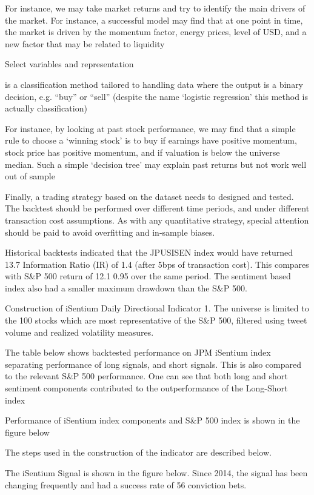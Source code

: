 \documentclass[a4paper]{article}
\begin{document}
For instance, we may take market returns and try to
identify the main drivers of the market. For instance, a successful model may find that at one point in time, the market is
driven by the momentum factor, energy prices, level of USD, and a new factor that may be related to liquidity

Select variables and representation

is a classification method tailored to handling data where the output is a
binary decision, e.g. “buy” or “sell” (despite the name ‘logistic regression’ this method is actually classification)

 For
instance, by looking at past stock performance, we may find that a simple rule to choose a ‘winning stock’ is to buy if
earnings have positive momentum, stock price has positive momentum, and if valuation is below the universe median. Such
a simple ‘decision tree’ may explain past returns but not work well out of sample

Finally, a trading strategy based on the dataset needs to designed and
tested. The backtest should be performed over different time periods, and under different transaction cost assumptions. As
with any quantitative strategy, special attention should be paid to avoid overfitting and in-sample biases. 

Historical backtests indicated that the JPUSISEN index would have returned 13.7%
Information Ratio (IR) of 1.4 (after 5bps of transaction cost). This compares with S\&P 500 return of 12.1%
0.95 over the same period. The sentiment based index also had a smaller maximum drawdown than the S\&P 500.

Construction of iSentium Daily Directional Indicator
1. The universe is limited to the 100 stocks which are most representative of the S\&P 500, filtered using tweet volume
and realized volatility measures.

The table below shows backtested performance on JPM iSentium index separating performance of long signals, and short
signals. This is also compared to the relevant S\&P 500 performance. One can see that both long and short sentiment
components contributed to the outperformance of the Long-Short index

Performance of iSentium index components and S\&P 500 index is shown in the figure below

 The steps used in the construction of the indicator are described below.
 
 The iSentium Signal is shown in the figure below. Since 2014, the signal has been changing frequently and had a success
rate of 56%
conviction bets.
\end{document}
